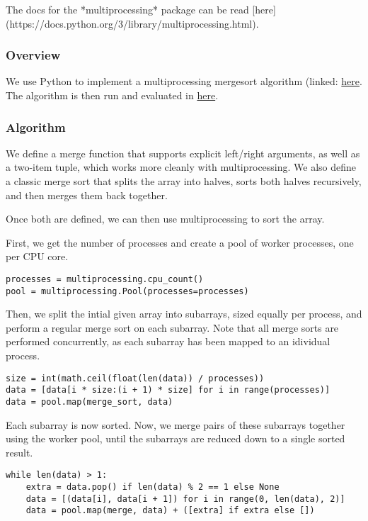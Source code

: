 The docs for the *multiprocessing* package can be read 
[here](https://docs.python.org/3/library/multiprocessing.html).

\subsubsection{Overview}

We use Python to implement a multiprocessing mergesort algorithm
(linked: \href{https://github.com/cloudmesh/cloudmesh-mpi/blob/main/examples/sort/multiprocessing_mergesort.py}{here}. The
algorithm is then run and evaluated
in \href{https://github.com/cloudmesh/cloudmesh-mpi/blob/main/examples/sort/sandra.ipynb}{here}.

\subsubsection{Algorithm}

We define a merge function that supports explicit left/right arguments, as well as a two-item tuple, which works more
cleanly with multiprocessing. We also define a classic merge sort that splits the array into halves, sorts both halves
recursively, and then merges them back together.

Once both are defined, we can then use multiprocessing to sort the array.

First, we get the number of processes and create a pool of worker processes, one per CPU core.

\begin{verbatim}
processes = multiprocessing.cpu_count()
pool = multiprocessing.Pool(processes=processes)
\end{verbatim}

Then, we split the intial given array into subarrays, sized equally per process, and perform a regular merge sort on
each subarray. Note that all merge sorts are performed concurrently, as each subarray has been mapped to an idividual
process.

\begin{verbatim}
size = int(math.ceil(float(len(data)) / processes))
data = [data[i * size:(i + 1) * size] for i in range(processes)]
data = pool.map(merge_sort, data)
\end{verbatim}

Each subarray is now sorted. Now, we merge pairs of these subarrays together using the worker pool, until the subarrays
are reduced down to a single sorted result.

\begin{verbatim}
while len(data) > 1:
    extra = data.pop() if len(data) % 2 == 1 else None
    data = [(data[i], data[i + 1]) for i in range(0, len(data), 2)]
    data = pool.map(merge, data) + ([extra] if extra else [])
\end{verbatim}

